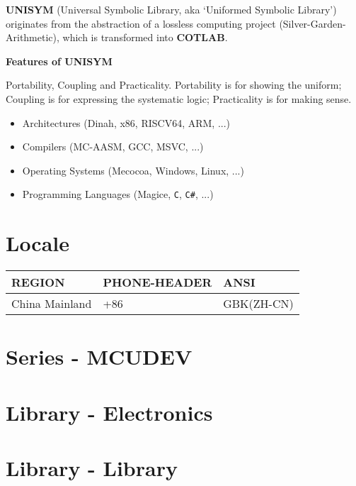 

\textbf{UNISYM} (Universal Symbolic Library, aka `Uniformed Symbolic Library') originates from the abstraction of a lossless computing project (Silver-Garden-Arithmetic), which is transformed into \textbf{COTLAB}.

\textbf{Features of UNISYM}

Portability, Coupling and Practicality. Portability is for showing the uniform; Coupling is for expressing the systematic logic; Practicality is for making sense.

\begin{itemize}
	\item Architectures (Dinah, x86, RISCV64, ARM, ...)
	\item Compilers (MC-AASM, GCC, MSVC, ...)
	\item Operating Systems (Mecocoa, Windows, Linux, ...)
	\item Programming Languages (Magice, \verb|C|, \verb|C#|, ...)
\end{itemize}

\section{Locale}

\begin{center}\begin{table}[h!]
	\begin{tabular}{|l|l|l|}
	\hline
	\rowcolor[rgb]{0.95, 0.975, 1}\textbf{REGION} & \textbf{PHONE-HEADER} & \textbf{ANSI} \\ \hline
	China Mainland & +86 & GBK(ZH-CN) \\ \hline
	\end{tabular}
\end{table}\end{center}

\section{Series \mbox{-} {MCUDEV}}

\section{Library \mbox{-} Electronics}

\section{Library \mbox{-}  Library}

